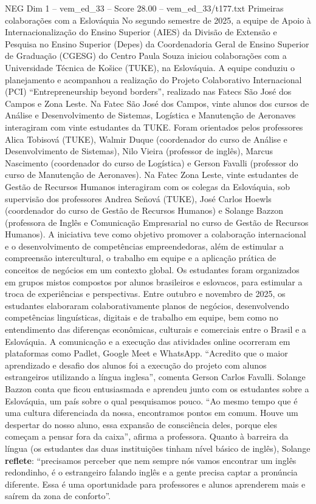 \begin{textsample}{NEG Dim 1 – vem\_ed\_33 – Score 28.00 – vem\_ed\_33/t177.txt}  \label{ex:f1_neg_115}
Primeiras colaborações com a Eslováquia No segundo semestre de 2025, a equipe de Apoio à Internacionalização do Ensino Superior (AIES) da Divisão de Extensão e Pesquisa no Ensino Superior (Depes) da Coordenadoria Geral de Ensino Superior de Graduação (CGESG) do Centro Paula Souza iniciou colaborações com a Universidade Técnica de Košice (TUKE), na Eslováquia.
A equipe conduziu o planejamento e acompanhou a realização do Projeto Colaborativo Internacional (PCI) “Entrepreneurship beyond borders”, realizado nas Fatecs São José dos Campos e Zona Leste.
Na Fatec São José dos Campos, vinte alunos dos cursos de Análise e Desenvolvimento de Sistemas, Logística e Manutenção de Aeronaves interagiram com vinte estudantes da TUKE.
Foram orientados pelos professores Alica Tobisová (TUKE), Walmir Duque (coordenador do curso de Análise e Desenvolvimento de Sistemas), Nilo Vieira (professor de inglês), Marcus Nascimento (coordenador do curso de Logística) e Gerson Favalli (professor do curso de Manutenção de Aeronaves).
Na Fatec Zona Leste, vinte estudantes de Gestão de Recursos Humanos interagiram com os colegas da Eslováquia, sob supervisão dos professores Andrea Seňová (TUKE), José Carlos Hoewls (coordenador do curso de Gestão de Recursos Humanos) e Solange Bazzon (professora de Inglês e Comunicação Empresarial no curso de Gestão de Recursos Humanos).
A iniciativa teve como objetivo promover a colaboração internacional e o desenvolvimento de competências empreendedoras, além de estimular a compreensão intercultural, o trabalho em equipe e a aplicação prática de conceitos de negócios em um contexto global.
Os estudantes foram organizados em grupos mistos compostos por alunos brasileiros e eslovacos, para estimular a troca de experiências e perspectivas.
Entre outubro e novembro de 2025, os estudantes elaboraram colaborativamente planos de negócios, desenvolvendo competências linguísticas, digitais e de trabalho em equipe, bem como no entendimento das diferenças econômicas, culturais e comerciais entre o Brasil e a Eslováquia.
A comunicação e a execução das atividades online ocorreram em plataformas como Padlet, Google Meet e WhatsApp. “Acredito que o maior aprendizado e desafio dos alunos foi a execução do projeto com alunos estrangeiros utilizando a língua inglesa”, comenta Gerson Carlos Favalli.
Solange Bazzon conta que ficou entusiasmada e aprendeu junto com os estudantes sobre a Eslováquia, um país sobre o qual pesquisamos pouco. “Ao mesmo tempo que é uma cultura diferenciada da nossa, encontramos pontos em comum.
Houve um despertar do nosso aluno, essa expansão de consciência deles, porque eles começam a pensar fora da caixa”, afirma a professora.
Quanto à barreira da língua (os estudantes das duas instituições tinham nível básico de inglês), Solange \textbf{reflete}: “precisamos perceber que nem sempre nós vamos encontrar um inglês redondinho, é o estrangeiro falando inglês e a gente precisa captar a pronúncia diferente.
Essa é uma oportunidade para professores e alunos aprenderem mais e saírem da zona de conforto”.

\end{textsample}

